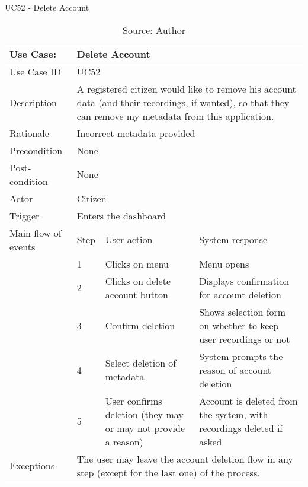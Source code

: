 \begin{table}[h]
\centering
\caption{UC52 - Delete Account}
\label{uc:52}
\begin{tabular}{|p{3cm}|p{1cm}|p{5cm}|p{5cm}|}
\hline
Use Case:       & \multicolumn{3}{p{11cm}|}{Delete Account} \\ \hline
Use Case ID     & \multicolumn{3}{p{11cm}|}{UC52} \\ \hline
Description     & \multicolumn{3}{p{11cm}|}{A registered citizen would like to remove his account data (and their recordings, if wanted), so that they can remove my metadata from this application.} \\ \hline
Rationale       & \multicolumn{3}{p{11cm}|}{Incorrect metadata provided} \\ \hline
Precondition    & \multicolumn{3}{p{11cm}|}{None} \\ \hline
Post-condition  & \multicolumn{3}{p{11cm}|}{None} \\ \hline
Actor           & \multicolumn{3}{p{11cm}|}{Citizen} \\ \hline
Trigger         & \multicolumn{3}{p{11cm}|}{Enters the dashboard} \\ \hline
Main flow of events & Step  & User action & System response \\ \hline
                    & 1     & Clicks on menu & Menu opens \\ \hline
                    & 2     & Clicks on delete account button & Displays confirmation for account deletion \\ \hline
                    & 3     & Confirm deletion & Shows selection form on whether to keep user recordings or not\\ \hline
                    & 4     & Select deletion of metadata & System prompts the reason of account deletion \\ \hline
                    & 5     & User confirms deletion (they may or may not provide a reason) & Account is deleted from the system, with recordings deleted if asked \\ \hline
Exceptions      & \multicolumn{3}{p{11cm}|}{The user may leave the account deletion flow in any step (except for the last one) of the process.} \\ \hline
\end{tabular}
\caption*{Source: Author}
\end{table}
